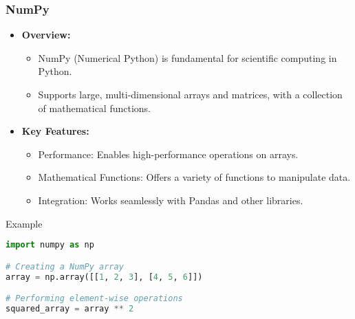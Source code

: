 \documentclass{beamer}
\begin{document}
\begin{frame}[fragile]
    \frametitle{NumPy}
    \begin{itemize}
        \item \textbf{Overview:} 
        \begin{itemize}
            \item NumPy (Numerical Python) is fundamental for scientific computing in Python.
            \item Supports large, multi-dimensional arrays and matrices, with a collection of mathematical functions.
        \end{itemize}

        \item \textbf{Key Features:} 
        \begin{itemize}
            \item Performance: Enables high-performance operations on arrays.
            \item Mathematical Functions: Offers a variety of functions to manipulate data.
            \item Integration: Works seamlessly with Pandas and other libraries.
        \end{itemize}
    \end{itemize}

    \begin{block}{Example}
    \begin{lstlisting}[language=Python]
import numpy as np

# Creating a NumPy array
array = np.array([[1, 2, 3], [4, 5, 6]])

# Performing element-wise operations
squared_array = array ** 2
    \end{lstlisting}
    \end{block}
\end{frame}
\end{document}
